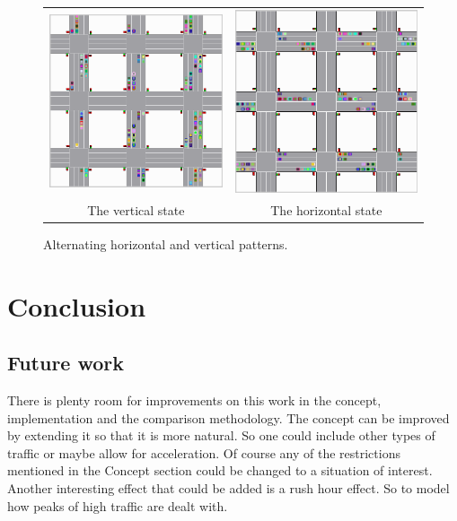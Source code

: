 \documentclass[a4paper,11pt]{article}
\begin{document}
\begin{figure}[H]
  \centering
  \begin{tabular}{cc}
  \includegraphics[width=.45\linewidth]{img/vertical.png} & \includegraphics[width=.45\linewidth]{img/horizontal.png}\\
  The vertical state & The horizontal state\\
  \end{tabular}
  \caption{Alternating horizontal and vertical patterns.}
  \label{fig:pattern}
\end{figure}

\section{Conclusion}\label{sec:conclusion}


\subsection{Future work}

There is plenty room for improvements on this work in the concept, implementation and the comparison methodology.
The concept can be improved by extending it so that it is more natural.
So one could include other types of traffic or maybe allow for acceleration.
Of course any of the restrictions mentioned in the Concept section could be changed to a situation of interest.
Another interesting effect that could be added is a rush hour effect.
So to model how peaks of high traffic are dealt with.
\end{document}
